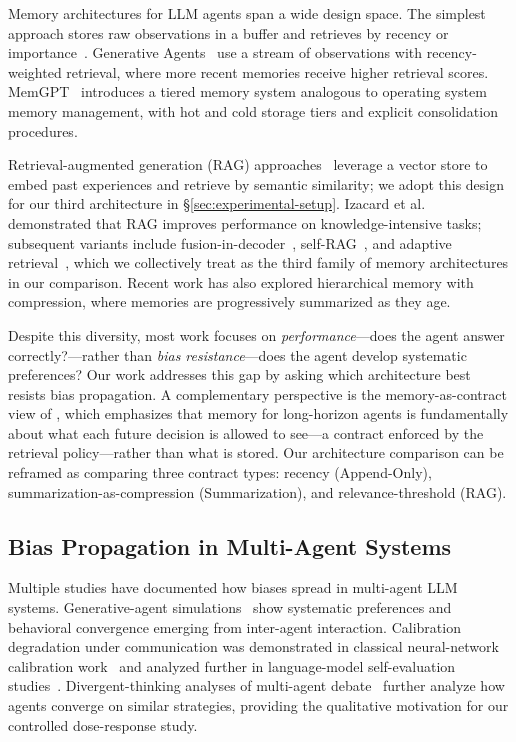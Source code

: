 \documentclass[11pt]{article}
\begin{document}
Memory architectures for LLM agents span a wide design space. The simplest approach stores raw observations in a buffer and retrieves by recency or importance~\cite{park2023generative}. Generative Agents~\cite{park2023generative} use a stream of observations with recency-weighted retrieval, where more recent memories receive higher retrieval scores. MemGPT~\cite{packer2023memgpt} introduces a tiered memory system analogous to operating system memory management, with hot and cold storage tiers and explicit consolidation procedures.

Retrieval-augmented generation (RAG) approaches~\cite{lewis2020rag} leverage a vector store to embed past experiences and retrieve by semantic similarity; we adopt this design for our third architecture in \S\ref{sec:experimental-setup}. Izacard et al.~\cite{izacard2022fusion} demonstrated that RAG improves performance on knowledge-intensive tasks; subsequent variants include fusion-in-decoder~\cite{izacard2022fusion}, self-RAG~\cite{asai2023selfrag}, and adaptive retrieval~\cite{jiang2023active}, which we collectively treat as the third family of memory architectures in our comparison. Recent work has also explored hierarchical memory with compression, where memories are progressively summarized as they age.

Despite this diversity, most work focuses on \emph{performance}---does the agent answer correctly?---rather than \emph{bias resistance}---does the agent develop systematic preferences? Our work addresses this gap by asking which architecture best resists bias propagation. A complementary perspective is the memory-as-contract view of \citet{cheng2026agenticsts}, which emphasizes that memory for long-horizon agents is fundamentally about what each future decision is allowed to see---a contract enforced by the retrieval policy---rather than what is stored. Our architecture comparison can be reframed as comparing three contract types: recency (Append-Only), summarization-as-compression (Summarization), and relevance-threshold (RAG).

\subsection{Bias Propagation in Multi-Agent Systems}

Multiple studies have documented how biases spread in multi-agent LLM systems. Generative-agent simulations~\cite{park2023generative} show systematic preferences and behavioral convergence emerging from inter-agent interaction. Calibration degradation under communication was demonstrated in classical neural-network calibration work~\cite{guo2017calibration} and analyzed further in language-model self-evaluation studies~\cite{kadavath2022language}. Divergent-thinking analyses of multi-agent debate~\cite{liang2023multiagent} further analyze how agents converge on similar strategies, providing the qualitative motivation for our controlled dose-response study.
\end{document}
